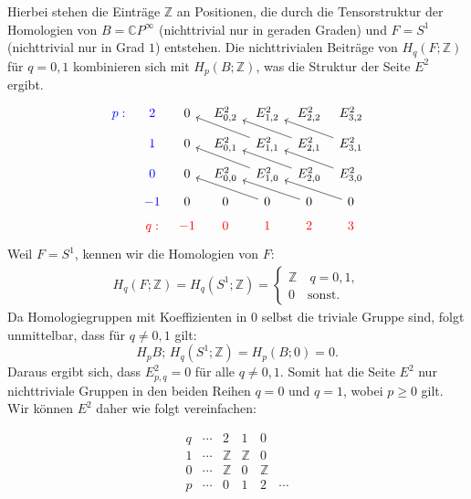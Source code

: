 \documentclass[12pt]{article}
\numberwithin{conj}{section}
\begin{document}
    Hierbei stehen die Einträge $\mathbb{Z}$ an Positionen, die durch die Tensorstruktur
    der Homologien von $B = \mathbb{C}P^{\infty}$ (nichttrivial nur in geraden
    Graden) und $F = S^{1}$ (nichttrivial nur in Grad $1$) entstehen. Die
    nichttrivialen Beiträge von $H_{q}(F;\mathbb{Z})$ für $q = 0,1$ kombinieren
    sich mit $H_{p}(B;\mathbb{Z})$, was die Struktur der Seite $E^{2}$ ergibt.
    \[
        \begin{tikzcd}
            [sep=tiny] {\color{blue}p:} & {\color{blue}2} & 0 & {E^2_{0,2}} & {E^2_{1,2}}
            & {E^2_{2,2}} & {E^2_{3,2}} \\ & {\color{blue}1} & 0 & {E^2_{0,1}} & {E^2_{1,1}}
            & {E^2_{2,1}} & {E^2_{3,1}} \\ & {\color{blue}0} & 0 & {E^2_{0,0}} & {E^2_{1,0}}
            & {E^2_{2,0}} & {E^2_{3,0}} \\ & {\color{blue}-1} & 0 & 0 & 0 & 0 & 0 \\ &
            {\color{red}q:} & {\color{red}-1} & {\color{red}0} & {\color{red}1} & {\color{red}2}
            & {\color{red}3} \arrow[from=2-5, to=1-3] \arrow[from=2-6, to=1-4] \arrow[from=2-7,
            to=1-5] \arrow[from=3-5, to=2-3] \arrow[from=3-6, to=2-4] \arrow[from=3-7,
            to=2-5] \arrow[from=4-5, to=3-3] \arrow[from=4-6, to=3-4] \arrow[from=4-7,
            to=3-5]
        \end{tikzcd}
    \]
    Weil $F = S^{1}$, kennen wir die Homologien von $F$:
    \begin{align}
        H_{q}(F;\mathbb{Z}) = H_{q}(S^{1};\mathbb{Z}) = \begin{cases}\mathbb{Z} \quad q = 0,1, \\ 0 \quad \text{sonst.}\end{cases}
    \end{align}
    Da Homologiegruppen mit Koeffizienten in $0$ selbst die triviale Gruppe sind, folgt
    unmittelbar, dass für $q \neq 0,1$ gilt:
    \[
        H_{p} B;\, H_{q}(S^{1};\mathbb{Z})  = H_{p}(B;0) = 0.
    \]
    Daraus ergibt sich, dass $E^{2}_{p,q}= 0$ für alle $q \neq 0,1$. Somit hat die
    Seite $E^{2}$ nur nichttriviale Gruppen in den beiden Reihen $q = 0$ und $q = 1$,
    wobei $p \geq 0$ gilt. Wir können $E^{2}$ daher wie folgt vereinfachen:

    \[
        \begin{array}{c|c|c|c|c|c}
            q & \cdots & 2          & 1          & 0          &        \\
            \hline
            1 & \cdots & \mathbb{Z} & \mathbb{Z} & 0          &        \\
            0 & \cdots & \mathbb{Z} & 0          & \mathbb{Z} &        \\
            \hline
            p & \cdots & 0          & 1          & 2          & \cdots
        \end{array}
    \]
\end{document}
